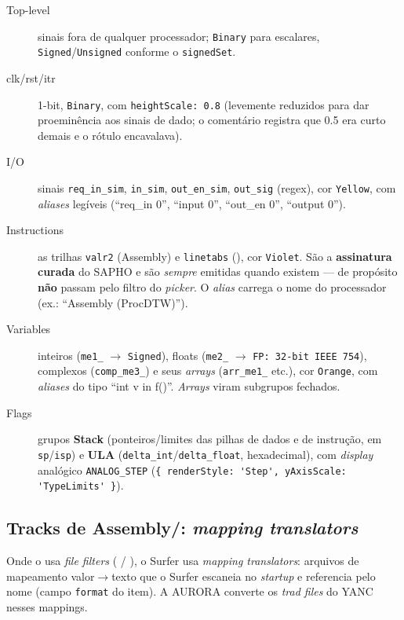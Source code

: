 \begin{description}
  \item[Top-level] sinais fora de qualquer processador; \lstinline|Binary| para
        escalares, \lstinline|Signed|/\lstinline|Unsigned| conforme o
        \lstinline|signedSet|.
  \item[clk/rst/itr] 1-bit, \lstinline|Binary|, com \lstinline|heightScale: 0.8|
        (levemente reduzidos para dar proeminência aos sinais de dado; o comentário
        registra que 0.5 era curto demais e o rótulo encavalava).
  \item[I/O] sinais \lstinline|req_in_sim|, \lstinline|in_sim|,
        \lstinline|out_en_sim|, \lstinline|out_sig| (regex), cor \lstinline|Yellow|,
        com \emph{aliases} legíveis (\enquote{req\_in 0}, \enquote{input 0},
        \enquote{out\_en 0}, \enquote{output 0}).
  \item[Instructions] as trilhas \lstinline|valr2| (Assembly) e \lstinline|linetabs|
        (\cmm{}), cor \lstinline|Violet|. São a \textbf{assinatura curada} do SAPHO e
        são \emph{sempre} emitidas quando existem — de propósito \textbf{não} passam
        pelo filtro do \emph{picker}. O \emph{alias} carrega o nome do processador
        (ex.: \enquote{Assembly (ProcDTW)}).
  \item[Variables] inteiros (\lstinline|me1_| $\rightarrow$ \lstinline|Signed|),
        floats (\lstinline|me2_| $\rightarrow$ \lstinline|FP: 32-bit IEEE 754|),
        complexos (\lstinline|comp_me3_|) e seus \emph{arrays}
        (\lstinline|arr_me1_| etc.), cor \lstinline|Orange|, com \emph{aliases} do
        tipo \enquote{int v in f()}. \emph{Arrays} viram subgrupos fechados.
  \item[Flags] grupos \textbf{Stack} (ponteiros/limites das pilhas de dados e de
        instrução, em \lstinline|sp|/\lstinline|isp|) e \textbf{ULA}
        (\lstinline|delta_int|/\lstinline|delta_float|, hexadecimal), com
        \emph{display} analógico \lstinline|ANALOG_STEP|
        (\lstinline|{ renderStyle: 'Step', yAxisScale: 'TypeLimits' }|).
\end{description}

\subsection{Tracks de Assembly/\cmm{}: \emph{mapping translators}}
\label{sec:cap10-surfer-mapping}

Onde o  usa \emph{file filters} ( /
), o Surfer usa \emph{mapping translators}: arquivos de
mapeamento valor$\rightarrow$texto que o Surfer escaneia no \emph{startup} e
referencia pelo nome (campo \lstinline|format| do item). A AURORA converte os
\emph{trad files} do YANC nesses mappings.

